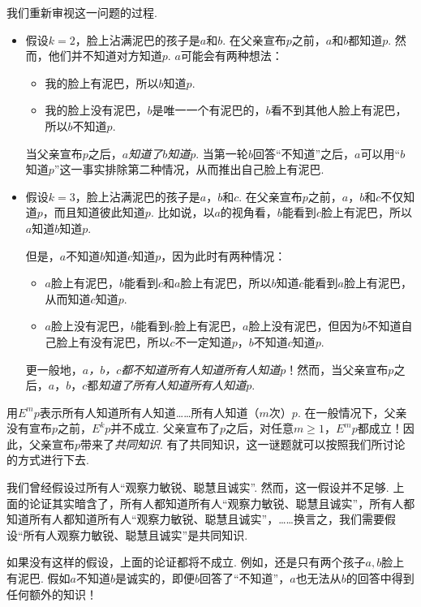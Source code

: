 我们重新审视这一问题的过程. 
\begin{itemize}
    \item 
    假设$k=2$，脸上沾满泥巴的孩子是$a$和$b$. 在父亲宣布$p$之前，$a$和$b$都知道$p$. 然而，他们并不知道对方知道$p$. $a$可能会有两种想法：
        \begin{itemize}
            \item 我的脸上有泥巴，所以$b$知道$p$.
            \item 我的脸上没有泥巴，$b$是唯一一个有泥巴的，$b$看不到其他人脸上有泥巴，所以$b$不知道$p$.
        \end{itemize}
    当父亲宣布$p$之后，\textit{$a$知道了$b$知道$p$}. 当第一轮$b$回答“不知道”之后，$a$可以用“$b$知道$p$”这一事实排除第二种情况，从而推出自己脸上有泥巴.    
    \item 假设$k=3$，脸上沾满泥巴的孩子是$a$，$b$和$c$. 在父亲宣布$p$之前，$a$，$b$和$c$不仅知道$p$，而且知道彼此知道$p$. 比如说，以$a$的视角看，$b$能看到$c$脸上有泥巴，所以$a$知道$b$知道$p$. 
    
    但是，$a$不知道$b$知道$c$知道$p$，因为此时有两种情况：
    \begin{itemize}
        \item $a$脸上有泥巴，$b$能看到$c$和$a$脸上有泥巴，所以$b$知道$c$能看到$a$脸上有泥巴，从而知道$c$知道$p$.
        \item $a$脸上没有泥巴，$b$能看到$c$脸上有泥巴，$a$脸上没有泥巴，但因为$b$不知道自己脸上有没有泥巴，所以$c$不一定知道$p$，$b$不知道$c$知道$p$.
    \end{itemize}
    更一般地，\textit{$a$，$b$，$c$都不知道所有人知道所有人知道$p$}！然而，当父亲宣布$p$之后，$a$，$b$，$c$都\textit{知道了所有人知道所有人知道$p$}.
\end{itemize}

用$E^m p$表示所有人知道所有人知道……所有人知道（$m$次）$p$. 在一般情况下，父亲没有宣布$p$之前，$E^k p$并不成立. 父亲宣布了$p$之后，对任意$m\geq 1$，$E^m p$都成立！因此，父亲宣布$p$带来了\textit{共同知识}. 有了共同知识，这一谜题就可以按照我们所讨论的方式进行下去.

我们曾经假设过所有人“观察力敏锐、聪慧且诚实”. 然而，这一假设并不足够. 上面的论证其实暗含了，所有人都知道所有人“观察力敏锐、聪慧且诚实”，所有人都知道所有人都知道所有人“观察力敏锐、聪慧且诚实”，……换言之，我们需要假设“所有人观察力敏锐、聪慧且诚实”是共同知识. 

如果没有这样的假设，上面的论证都将不成立. 例如，还是只有两个孩子$a,b$脸上有泥巴. 假如$a$不知道$b$是诚实的，即便$b$回答了“不知道”，$a$也无法从$b$的回答中得到任何额外的知识！

